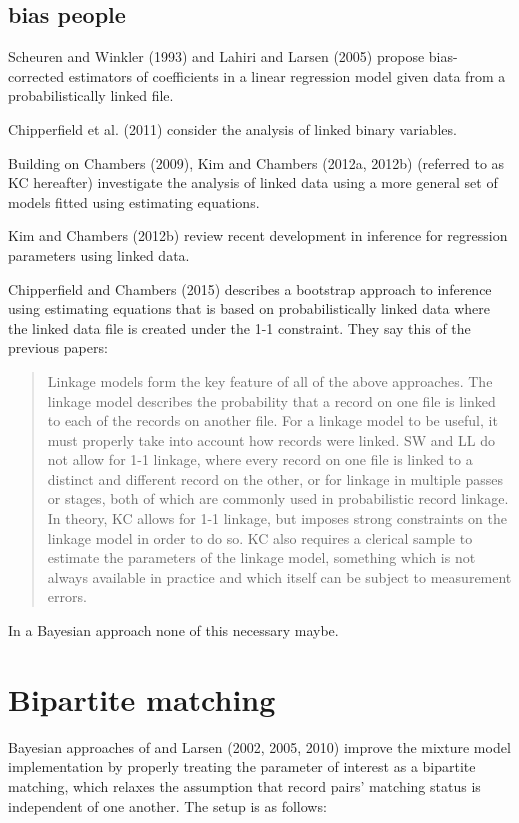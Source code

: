 \documentclass[11pt,reqno]{amsart}
\begin{document}
\subsection{bias people}
Scheuren and Winkler (1993) and Lahiri and Larsen (2005) propose bias-corrected estimators of coefficients in a linear regression model given data from a probabilistically linked file. 

Chipperfield et al. (2011) consider the analysis of linked binary variables.

Building on Chambers (2009), Kim and Chambers (2012a, 2012b) (referred to as KC hereafter) investigate the analysis of linked data using a more general set of models fitted using estimating equations.

Kim and Chambers (2012b) review recent development in inference for regression parameters
using linked data.

Chipperfield and Chambers (2015) describes a bootstrap approach to inference using estimating equations that is based on probabilistically linked data where the linked data file is created under the 1-1 constraint.  They say this of the previous papers: 

\begin{quote}
Linkage models form the key feature of all of the above approaches. The linkage model
describes the probability that a record on one file is linked to each of the records on another
file. For a linkage model to be useful, it must properly take into account how records were
linked. SW and LL do not allow for 1-1 linkage, where every record on one file is linked to
a distinct and different record on the other, or for linkage in multiple passes or stages,
both of which are commonly used in probabilistic record linkage. In theory, KC allows
for 1-1 linkage, but imposes strong constraints on the linkage model in order to do so.
KC also requires a clerical sample to estimate the parameters of the linkage model,
something which is not always available in practice and which itself can be subject to
measurement errors.
\end{quote}

In a Bayesian approach none of this necessary maybe. 

\section{Bipartite matching}
Bayesian approaches of \cite{fortini2001} and Larsen (2002, 2005, 2010) improve the mixture model implementation by properly treating the parameter of interest as a bipartite matching, which relaxes the assumption that record pairs' matching status is independent of one another.  The setup is as follows:
\end{document}
